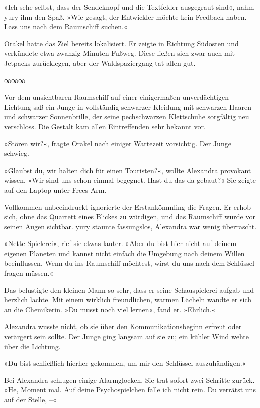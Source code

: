 »Ich sehe selbst, dass der Sendeknopf und die Textfelder ausgegraut sind«, nahm yury ihm den Spaß. »Wie gesagt, der Entwickler möchte kein Feedback haben. Lass uns nach dem Raumschiff suchen.«

Orakel hatte das Ziel bereits lokalisiert. Er zeigte in Richtung Südosten und verkündete etwa zwanzig Minuten Fußweg. Diese ließen sich zwar auch mit Jetpacks zurücklegen, aber der Waldspaziergang tat allen gut.

\begin{center}
∞∞∞
\end{center}

Vor dem unsichtbaren Raumschiff auf einer einigermaßen unverdächtigen Lichtung saß ein Junge in vollständig schwarzer Kleidung mit schwarzen Haaren und schwarzer Sonnenbrille, der seine pechschwarzen Klettschuhe sorgfältig neu verschloss. Die Gestalt kam allen Eintreffenden sehr bekannt vor.

»Stören wir?«, fragte Orakel nach einiger Wartezeit vorsichtig. Der Junge schwieg.

»Glaubst du, wir halten dich für einen Touristen?«, wollte Alexandra provokant wissen. »Wir sind uns schon einmal begegnet. Hast du das da gebaut?« Sie zeigte auf den Laptop unter Frees Arm.

Vollkommen unbeeindruckt ignorierte der Erstankömmling die Fragen. Er erhob sich, ohne das Quartett eines Blickes zu würdigen, und das Raumschiff wurde vor seinen Augen sichtbar. yury staunte fassungslos, Alexandra war wenig überrascht.

»Nette Spielerei«, rief sie etwas lauter. »Aber du bist hier nicht auf deinem eigenen Planeten und kannst nicht einfach die Umgebung nach deinem Willen beeinflussen. Wenn du ins Raumschiff möchtest, wirst du uns nach dem Schlüssel fragen müssen.«

Das belustigte den kleinen Mann so sehr, dass er seine Schauspielerei aufgab und herzlich lachte. Mit einem wirklich freundlichen, warmen Lächeln wandte er sich an die Chemikerin. »Du musst noch viel lernen«, fand er. »Ehrlich.«

Alexandra wusste nicht, ob sie über den Kommunikationsbeginn erfreut oder verärgert sein sollte. Der Junge ging langsam auf sie zu; ein kühler Wind wehte über die Lichtung.

»Du bist schließlich hierher gekommen, um mir den Schlüssel auszuhändigen.«

Bei Alexandra schlugen einige Alarmglocken. Sie trat sofort zwei Schritte zurück. »He, Moment mal. Auf deine Psychospielchen falle ich nicht rein. Du verrätst uns auf der Stelle, –«

